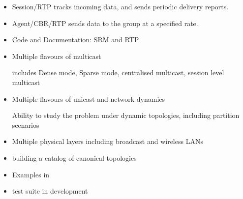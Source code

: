 \documentclass[landscape]{foils}
\begin{document}
\begin{comment}
\item done by loss objects
\end{comment}

\begin{itemize}
\item Session/RTP tracks incoming data, and sends periodic delivery
  reports.
\item Agent/CBR/RTP sends data to the group at a specified rate.
\end{itemize}

\begin{comment}
\item need slides on RTP
\item RTPSource adjunct class to set src id, but not clear it if
  generates
data.
\item report-interval, session bw etc. can be controlled.
\item CBR agent generates data, and when it recvs from outside
hands it to session to generate report
\end{comment}

\begin{itemize}
\item Code and Documentation:  SRM and RTP

\item Multiple flavours of multicast
  
  {\small
  includes Dense mode, Sparse mode, centralised multicast, session level
  multicast
  }

\item Multiple flavours of unicast and network dynamics

  {\small
  Ability to study the problem under dynamic topologies, including
  partition scenarios
  }

\item Multiple physical layers including broadcast and wireless LANs

\item building a catalog of canonical topologies

\item Examples in 

\item test suite in development
\end{itemize}

\begin{comment}
\item vertical slice through code.
\end{comment}
\end{document}
